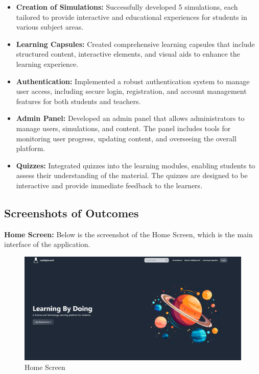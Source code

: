 \begin{itemize}[leftmargin=1cm]
    \item \textbf{Creation of Simulations:} Successfully developed 5 simulations, each tailored to provide interactive and educational experiences for students in various subject areas.
    
    \item \textbf{Learning Capsules:} Created comprehensive learning capsules that include structured content, interactive elements, and visual aids to enhance the learning experience.
    
    \item \textbf{Authentication:} Implemented a robust authentication system to manage user access, including secure login, registration, and account management features for both students and teachers.
    
    \item \textbf{Admin Panel:} Developed an admin panel that allows administrators to manage users, simulations, and content. The panel includes tools for monitoring user progress, updating content, and overseeing the overall platform.
    
    \item \textbf{Quizzes:} Integrated quizzes into the learning modules, enabling students to assess their understanding of the material. The quizzes are designed to be interactive and provide immediate feedback to the learners.
\end{itemize}
\subsection{Screenshots of Outcomes}
\textbf{Home Screen:} Below is the screenshot of the Home Screen, which is the main interface of the application.
\begin{figure}[H]
    \centering
    \includegraphics[width = 14cm]{Diagrams/output/home.png}
    \caption{Home Screen}
\end{figure}

